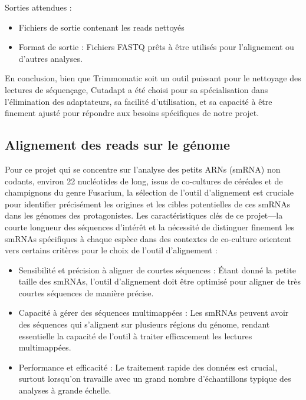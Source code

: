 \documentclass{report}
\begin{document}
\noindent Sorties attendues :
 \begin{itemize}
     \item Fichiers de sortie contenant les reads nettoyés
     \item Format de sortie : Fichiers FASTQ prêts à être utilisés pour l'alignement ou d'autres analyses.
 \end{itemize} \vspace{.5cm}
 
En conclusion, bien que Trimmomatic soit un outil puissant pour le nettoyage des lectures de séquençage, Cutadapt a été choisi pour sa spécialisation dans l'élimination des adaptateurs, sa facilité d'utilisation, et sa capacité à être finement ajusté pour répondre aux besoins spécifiques de notre projet.
 
\subsection{Alignement des reads sur le génome}
Pour ce projet qui se concentre sur l'analyse des petits ARNs (smRNA) non codants, environ 22 nucléotides de long, issus de co-cultures de céréales et de champignons du genre Fusarium, la sélection de l'outil d'alignement est cruciale pour identifier précisément les origines et les cibles potentielles de ces smRNAs dans les génomes des protagonistes. Les caractéristiques clés de ce projet—la courte longueur des séquences d'intérêt et la nécessité de distinguer finement les smRNAs spécifiques à chaque espèce dans des contextes de co-culture orientent vers certains critères pour le choix de l'outil d'alignement :

\begin{itemize}
    \item Sensibilité et précision à aligner de courtes séquences : Étant donné la petite taille des smRNAs, l'outil d'alignement doit être optimisé pour aligner de très courtes séquences de manière précise.
    \item Capacité à gérer des séquences multimappées : Les smRNAs peuvent avoir des séquences qui s'alignent sur plusieurs régions du génome, rendant essentielle la capacité de l'outil à traiter efficacement les lectures multimappées.
    \item Performance et efficacité : Le traitement rapide des données est crucial, surtout lorsqu'on travaille avec un grand nombre d'échantillons typique des analyses à grande échelle.
\end{itemize} \vspace{.5cm}
\end{document}
